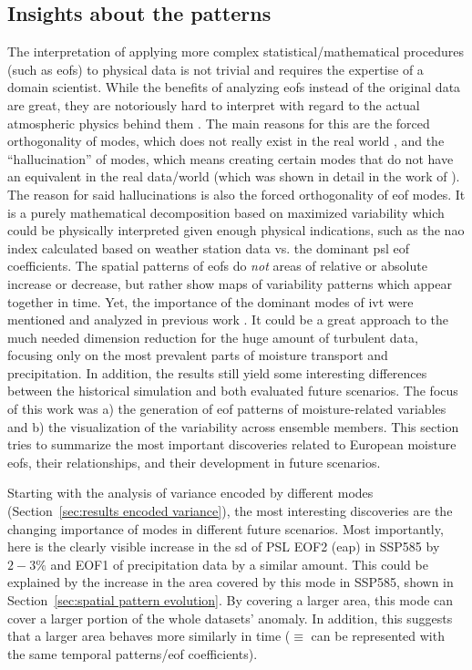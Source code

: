 \subsection{Insights about the patterns}

The interpretation of applying more complex statistical/mathematical procedures (such as \acp{eof}) to physical data is not trivial and requires the expertise of a domain scientist.
While the benefits of analyzing \acp{eof} instead of the original data are great, they are notoriously hard to interpret with regard to the actual atmospheric physics behind them \cite{dommenget_cautionary_2002, hannachi_empirical_2007}.
The main reasons for this are the forced orthogonality of modes, which does not really exist in the real world \cite{hannachi_empirical_2007}, and the \enquote{hallucination} of modes, which means creating certain modes that do not have an equivalent in the real data/world (which was shown in detail in the work of ). 
The reason for said hallucinations is also the forced orthogonality of \ac{eof} modes. 
It is a purely mathematical decomposition based on maximized variability which could be physically interpreted given enough physical indications, such as the \ac{nao} index calculated based on weather station data vs. the dominant \ac{psl} \ac{eof} coefficients.
The spatial patterns of \acp{eof} do \textit{not} areas of relative or absolute increase or decrease, but rather show maps of variability patterns which appear together in time.
Yet, the importance of the dominant modes of \ac{ivt} were mentioned and analyzed in previous work \cite{salstein_modes_1983, zou_interdecadal_2018}. 
It could be a great approach to the much needed dimension reduction for the huge amount of turbulent data, focusing only on the most prevalent parts of moisture transport and precipitation. 
In addition, the results still yield some interesting differences between the historical simulation and both evaluated future scenarios. 
The focus of this work was a) the generation of \ac{eof} patterns of moisture-related variables and b) the visualization of the variability across ensemble members. 
This section tries to summarize the most important discoveries related to European moisture \acp{eof}, their relationships, and their development in future scenarios. 

Starting with the analysis of variance encoded by different modes (Section~\ref{sec:results encoded variance}), the most interesting discoveries are the changing importance of modes in different future scenarios. 
Most importantly, here is the clearly visible increase in the \ac{sd} of PSL EOF2 (\ac{eap}) in SSP585 by $2-3 \%$ and EOF1 of precipitation data by a similar amount. 
This could be explained by the increase in the area covered by this mode in SSP585, shown in Section~\ref{sec:spatial pattern evolution}. 
By covering a larger area, this mode can cover a larger portion of the whole datasets' anomaly. 
In addition, this suggests that a larger area behaves more similarly in time ($\equiv$ can be represented with the same temporal patterns/\ac{eof} coefficients). 


